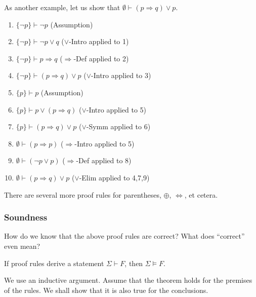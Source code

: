 As another example, let us show that $\emptyset\vdash(p\Rightarrow q)\vee p$.
\begin{enumerate}
    \item $\{\neg p\}\vdash\neg p$ \hfill (\textsf{Assumption})
    \item $\{\neg p\}\vdash \neg p \vee q$ \hfill (\textsf{$\vee$-Intro} applied to 1)
    \item $\{\neg p\}\vdash p \Rightarrow q$ \hfill (\textsf{$\Rightarrow$-Def} applied to 2)
    \item $\{\neg p\}\vdash (p \Rightarrow q)\vee p$ \hfill (\textsf{$\vee$-Intro} applied to 3)

    \item $\{p\}\vdash p$ \hfill (\textsf{Assumption})
    \item $\{p\}\vdash p\vee(p\Rightarrow q)$ \hfill (\textsf{$\vee$-Intro} applied to 5)
    \item $\{p\}\vdash (p\Rightarrow q)\vee p$ \hfill (\textsf{$\vee$-Symm} applied to 6)

    \item $\emptyset\vdash (p\Rightarrow p)$ \hfill (\textsf{$\Rightarrow$-Intro} applied to 5)
    \item $\emptyset\vdash (\neg p\vee p)$ \hfill (\textsf{$\Rightarrow$-Def} applied to 8)
    
    \item $\emptyset\vdash (p\Rightarrow q)\vee p$ \hfill (\textsf{$\vee$-Elim} applied to 4,7,9)
\end{enumerate}

There are several more proof rules for parentheses, $\oplus$, $\iff$, et cetera.

\subsubsection{Soundness}

How do we know that the above proof rules are correct? What does ``correct'' even mean?

\begin{theorem}
\label{theo: derivation implies modeling}
    If proof rules derive a statement $\Sigma\vdash F$, then $\Sigma\vDash F$.
\end{theorem}
We use an inductive argument. Assume that the theorem holds for the premises of the rules. We shall show that it is also true for the conclusions.\\

